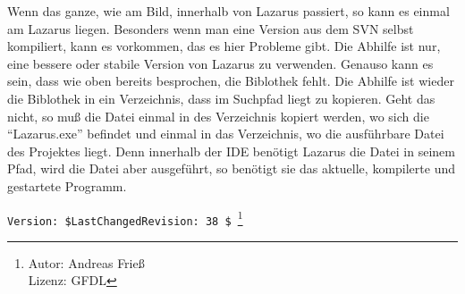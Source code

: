 Wenn das ganze, wie am Bild, innerhalb von Lazarus passiert, so kann es einmal am Lazarus liegen. Besonders wenn man eine Version aus dem SVN selbst kompiliert, kann es vorkommen, das es hier Probleme gibt. Die Abhilfe ist nur, eine bessere oder stabile Version von Lazarus zu verwenden. 
Genauso kann es sein, dass wie oben bereits besprochen, die Biblothek fehlt. Die Abhilfe ist wieder die Biblothek in ein Verzeichnis, dass im Suchpfad liegt zu kopieren. Geht das nicht, so muß die Datei einmal in des Verzeichnis kopiert werden, wo sich die "`Lazarus.exe"' befindet und einmal in das Verzeichnis, wo die ausführbare Datei des Projektes liegt. Denn innerhalb der IDE benötigt Lazarus die Datei in seinem Pfad, wird die Datei aber ausgeführt, so benötigt sie das aktuelle, kompilerte und gestartete Programm.

\verb|Version: $LastChangedRevision: 38 $ |\footnote{ Autor: Andreas Frieß\\Lizenz: GFDL}